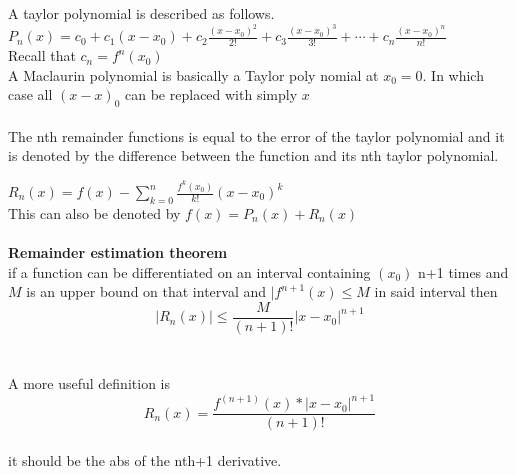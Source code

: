 \documentclass[14pt]{extreport}
\begin{document}
A taylor polynomial is described as follows.\\
$P_n(x) = c_0 + c_1(x-x_0) + c_2\frac{(x-x_0)^2}{2!} + c_3\frac{(x-x_0)^3}{3!} + \cdots + c_n\frac{(x-x_0)^n}{n!}$\\
Recall that $c_n = f^n(x_0)$\\
A Maclaurin polynomial is basically a Taylor poly nomial at $x_0 = 0$. In which case all $(x-x)_0$ can be replaced with simply $x$\\\\

The nth remainder functions is equal to the error of the taylor polynomial and it is denoted by the difference between the function and its nth taylor polynomial. 

$R_n(x) = f(x) - \sum_{k=0}^{n} \frac{f^k(x_0)}{k!}(x-x_0)^k$\\
This can also be denoted by $f(x) = P_n(x) + R_n(x)$\\\\

\textbf{Remainder estimation theorem}\\
if a function can be differentiated on an interval containing $(x_0)$ n+1 times and $M$ is an upper bound on that interval  and $|f^{n+1}(x) \le M$ in said interval then
$$|R_n(x)| \le \frac{M}{(n+1)!}|x-x_0|^{n+1}$$\\\\

A more useful definition is $$R_n(x) = \frac{f^{(n+1)}(x)*|x-x_0|^{n+1}}{(n+1)!}$$\\
it should be the abs of the nth+1 derivative.
\end{document}

